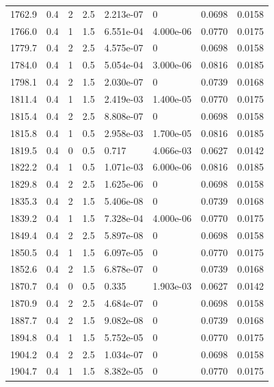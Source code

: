 \documentclass[preview]{standalone}
\begin{document}
{{{{\begin{tabular}{L{1.2cm}C{1.2cm} C{0.3cm}C{0.5cm} C{1.4cm}C{1.4cm} C{1.4cm}C{1.4cm}}
  1762.9  &   0.4  & 2     & 2.5 &  2.213e-07  & 0  & 0.0698 &  0.0158   \\ 
  1766.0  &   0.4  & 1     & 1.5 &  6.551e-04  & 4.000e-06  & 0.0770 &  0.0175   \\ 
  1779.7  &   0.4  & 2     & 2.5 &  4.575e-07  & 0  & 0.0698 &  0.0158   \\ 
  1784.0  &   0.4  & 1     & 0.5 &  5.054e-04  & 3.000e-06  & 0.0816 &  0.0185   \\ 
  1798.1  &   0.4  & 2     & 1.5 &  2.030e-07  & 0  & 0.0739 &  0.0168   \\ 
  1811.4  &   0.4  & 1     & 1.5 &  2.419e-03  & 1.400e-05  & 0.0770 &  0.0175   \\ 
  1815.4  &   0.4  & 2     & 2.5 &  8.808e-07  & 0  & 0.0698 &  0.0158   \\ 
  1815.8  &   0.4  & 1     & 0.5 &  2.958e-03  & 1.700e-05  & 0.0816 &  0.0185   \\ 
  1819.5  &   0.4  & 0     & 0.5 &  0.717  & 4.066e-03  & 0.0627 &  0.0142   \\ 
  1822.2  &   0.4  & 1     & 0.5 &  1.071e-03  & 6.000e-06  & 0.0816 &  0.0185   \\ 
  1829.8  &   0.4  & 2     & 2.5 &  1.625e-06  & 0  & 0.0698 &  0.0158   \\ 
  1835.3  &   0.4  & 2     & 1.5 &  5.406e-08  & 0  & 0.0739 &  0.0168   \\ 
  1839.2  &   0.4  & 1     & 1.5 &  7.328e-04  & 4.000e-06  & 0.0770 &  0.0175   \\ 
  1849.4  &   0.4  & 2     & 2.5 &  5.897e-08  & 0  & 0.0698 &  0.0158   \\ 
  1850.5  &   0.4  & 1     & 1.5 &  6.097e-05  & 0  & 0.0770 &  0.0175   \\ 
  1852.6  &   0.4  & 2     & 1.5 &  6.878e-07  & 0  & 0.0739 &  0.0168   \\ 
  1870.7  &   0.4  & 0     & 0.5 &  0.335  & 1.903e-03  & 0.0627 &  0.0142   \\ 
  1870.9  &   0.4  & 2     & 2.5 &  4.684e-07  & 0  & 0.0698 &  0.0158   \\ 
  1887.7  &   0.4  & 2     & 1.5 &  9.082e-08  & 0  & 0.0739 &  0.0168   \\ 
  1894.8  &   0.4  & 1     & 1.5 &  5.752e-05  & 0  & 0.0770 &  0.0175   \\ 
  1904.2  &   0.4  & 2     & 2.5 &  1.034e-07  & 0  & 0.0698 &  0.0158   \\ 
  1904.7  &   0.4  & 1     & 1.5 &  8.382e-05  & 0  & 0.0770 &  0.0175   \\ 

\end{tabular}}}}}
\end{document}
